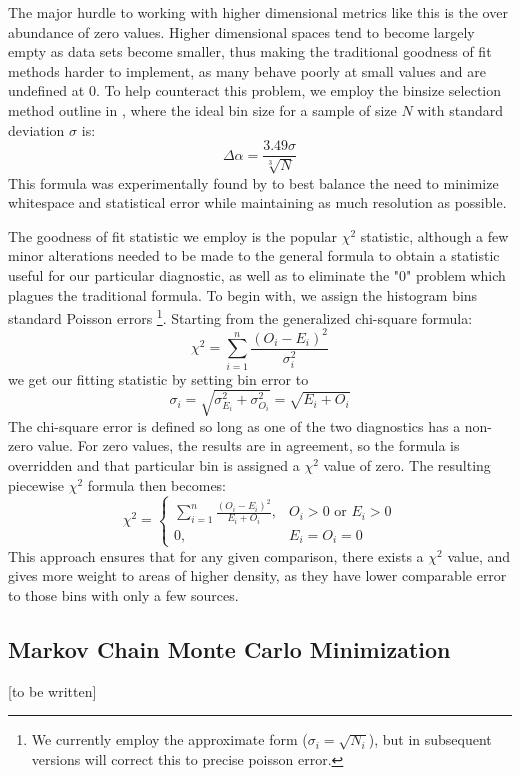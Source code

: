 \documentclass[twocolumn,letterpaper,10pt]{article}
\begin{document}
The major hurdle to working with higher dimensional metrics like this is the over abundance of zero values. Higher dimensional spaces tend to become largely empty as data sets become smaller, thus making the traditional goodness of fit methods harder to implement, as many behave poorly at small values and are undefined at 0. To help counteract this problem, we employ the binsize selection method outline in \citet{binsize}, where the ideal bin size for a sample of size $N$ with standard deviation $\sigma$ is: 
$$
\Delta \alpha=\frac{3.49\sigma}{\sqrt[3]{N}}$$
 This formula was experimentally found by \citet{binsize} to best balance the need to minimize whitespace and statistical error while maintaining as much resolution as possible.

The goodness of fit statistic we employ is the popular $\chi^2$ statistic, although a few minor alterations needed to be made to the general formula to obtain a statistic useful for our particular diagnostic, as well as to eliminate the "0" problem which plagues the traditional formula. To begin with, we assign the histogram bins standard Poisson errors \footnote{We currently employ the approximate form ($\sigma_i=\sqrt{N_i}$), but in subsequent versions will correct this to precise poisson error.}. Starting from the generalized chi-square formula:
$$
\chi^2=\sum\limits_{i=1}^n \frac{(O_i-E_i)^2}{\sigma_i^2}
$$
we get our fitting statistic by setting bin error to 
$$
\sigma_i=\sqrt{\sigma_{E_i}^2+\sigma_{O_i}^2}=\sqrt{E_i+O_i}
$$ 
The chi-square error is defined so long as one of the two diagnostics has a non-zero value. For zero values, the results are in agreement, so the formula is overridden and that particular bin is assigned a $\chi^2$ value of zero. The resulting piecewise $\chi^2$ formula then becomes:
$$
\chi^2=
\begin{cases}
\sum\limits_{i=1}^n \frac{(O_i-E_i)^2}{E_i+O_i}, & O_i > 0 \text{ or } E_i > 0 \\
0, & E_i=O_i=0
\end{cases}
$$
This approach ensures that for any given comparison, there exists a $\chi^2$ value, and gives more weight to areas of higher density, as they have lower comparable error to those bins with only a few sources.

\subsection{Markov Chain Monte Carlo Minimization}

[to be written]
\end{document}
